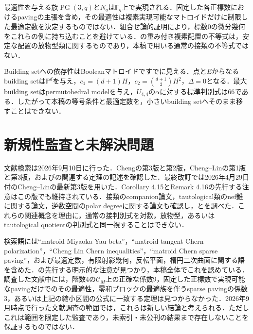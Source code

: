 \documentclass[12pt]{amsart}
\theoremstyle{definition}
\theoremstyle{remark}
\numberwithin{equation}{section}
\begin{document}
最適性を与える族$\operatorname{PG}(3,q)$と$N_q$は$\mathbb F_q$上で実現される．固定した各正標数におけるpavingの主張を含め，その最適性は複素実現可能なマトロイドだけに制限した最適定数を決定するものではない．組合せ論的証明により，標数0の微分幾何をこれらの例に持ち込むことを避けている．\cite[Theorem 1.1]{BP}の重み付き複素配置の不等式は，安定な配置の放物型類に関するものであり，本稿で用いる通常の接類の不等式ではない．

Building setへの依存性はBooleanマトロイドですでに見える．点と$E$からなるbuilding setは$\mathbb P^d$を与え，$c_1=(d+1)H$，$c_2=\binom{d+1}2H^2$，$\Delta=0$となる．最大building setはpermutohedral modelを与え，$U_{4,4}$の$\alpha$に対する標準判別式は66である．したがって本稿の等号条件と最適定数を，小さいbuilding setへそのまま移すことはできない．

\section{新規性監査と未解決問題}
文献検索は2026年9月10日に行った．Chengの\cite{Che}第3版と\cite{CheG}第2版，Cheng--Linの\cite{CL}第1版と第3版，および\cite{FY,AHK,ADH,BH,Man}の関連する定理の記述を確認した．最終改訂では2026年4月29日付のCheng--Linの最新第3版を用いた．Corollary 4.15とRemark 4.16の先行する注意はこの版でも維持されている．接類のcompanion論文\cite{CLG}，tautological類のnef錐に関する論文\cite{Sta}，逆数空間のpolar degreeに関する論文\cite{BKW}も確認し，\cite[Theorem 1.1]{BP}と\cite[Lemma 2.3]{Ali}を調べた．これらの関連概念を理由に，通常の接判別式を対数，放物型，あるいはtautological quotientの判別式と同一視することはできない．

検索語には``matroid Miyaoka Yau beta''，``matroid tangent Chern polarization''，``Cheng Lin Chern inequalities''，``matroid Chern sparse paving''，および最適定数，有限射影幾何，反転平面，楕円二次曲面に関する語を含めた．\cite[Remark 4.16]{CL}の先行する明示的な注意が見つかり，本稿全体でこれを認めている．調査した文献中には，階数4の$\mathscr C_M$上の正確な係数9，固定した正標数で実現可能なpavingだけでのその最適性，零和ブロックの最適族を伴うsparse pavingの係数3，あるいは上記の縮小区間の公式に一致する定理は見つからなかった．2026年9月時点で行った文献調査の範囲では，これらは新しい結論と考えられる．ただしこれは範囲を限定した監査であり，未索引・未公刊の結果まで存在しないことを保証するものではない．
\end{document}
